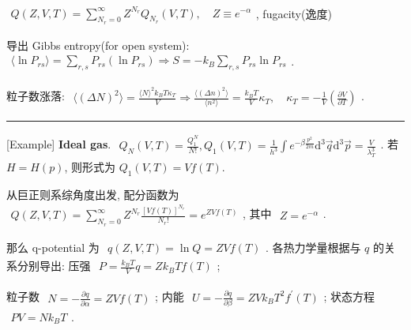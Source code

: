 \documentclass[../../main.tex]{subfiles}
\begin{document}
$\begin{aligned}
    Q(Z,V,T) = \sum_{N_{r}=0}^{\infty}Z^{N_{r}}Q_{N_{r}}(V,T),\quad Z \equiv e^{-\alpha}
\end{aligned}$,  fugacity(逸度)

导出 Gibbs entropy(for open system): $\begin{aligned}
    \langle \ln{P_{rs}}\rangle = \sum_{r,s}P_{rs}(\ln{P_{rs}})\Rightarrow S = -k_{B}\sum_{r,s}P_{rs}\ln{P_{rs}}
\end{aligned}$. 

粒子数涨落: $\begin{aligned}
    \langle(\Delta N)^{2}\rangle = \frac{\langle N\rangle^{2}k_{B}T\kappa_{T}}{V}
    \Rightarrow \frac{\langle (\Delta n)^{2}\rangle}{\langle n^{2}\rangle} = \frac{k_{B}T}{V}\kappa_{T},\quad \kappa_{T} = -\frac{1}{V}\left(\frac{\partial V}{\partial T}\right)
\end{aligned}$.

\vspace{0.5em}\hrule\vspace{0.5em}

[Example] \textbf{Ideal gas}. $\begin{aligned}
    Q_{N}(V,T) = \frac{Q_{1}^{N}}{N!}, Q_{1}(V,T) = \frac{1}{h^{3}}\int e^{-\beta \frac{p^{2}}{2m}}\mathrm{d}^{3}\vec{q}\mathrm{d}^{3}\vec{p} = \frac{V}{\lambda_{T}^{3}}
\end{aligned}$. 若 $H = H(p)$, 则形式为 
$Q_{1}(V,T) = Vf(T)$. 

从巨正则系综角度出发, 配分函数为 $\begin{aligned}
    Q(Z,V,T) = \sum_{N_{r}=0}^{\infty}Z^{N_{r}}\frac{[Vf(T)]^{N_{r}}}{N_{r}!} = e^{ZVf(T)}
\end{aligned}$, 其中 $\begin{aligned}
    Z = e^{-\alpha}
\end{aligned}$. 

那么 q-potential 为 $\begin{aligned}
    q(Z,V,T) = \ln{Q} = ZVf(T)
\end{aligned}$. 各热力学量根据与 $q$ 的关系分别导出: 压强 $\begin{aligned}
    P = \frac{k_{B}T}{V}q = Zk_{B}Tf(T)
\end{aligned}$; 

粒子数 $\begin{aligned}
    N = -\frac{\partial q}{\partial\alpha} = ZVf(T)
\end{aligned}$; 内能 $\begin{aligned}
    U = -\frac{\partial q}{\partial\beta} = ZVk_{B}T^{2}f^{\prime}(T)
\end{aligned}$; 状态方程 $\begin{aligned}
    PV = Nk_{B}T
\end{aligned}$. 
\end{document}
